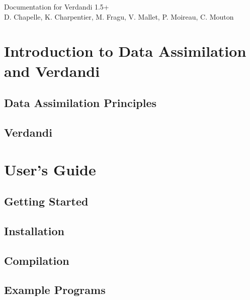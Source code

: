 \documentclass{book}
\begin{document}
\hypersetup{pageanchor=false,citecolor=blue}
\begin{titlepage}
\vspace*{7cm}
\begin{center}
{\Large Documentation for Verdandi 1.5+}\\
\vspace*{1cm}
{\large D. Chapelle, K. Charpentier, M. Fragu, V. Mallet, P. Moireau, C. Mouton}\\
\end{center}
\end{titlepage}
\clearemptydoublepage
{}
\tableofcontents
\clearemptydoublepage
{}
\hypersetup{pageanchor=true,citecolor=blue}
\part{Introduction to Data Assimilation and Verdandi}
\chapter{Data Assimilation Principles}

\chapter{Verdandi}
\label{index}\hypertarget{index}{}
\part{User's Guide}
\chapter{Getting Started}
\label{getting_started}
\hypertarget{getting_started}{}

\chapter{Installation}
\label{installation}
\hypertarget{installation}{}

\chapter{Compilation}
\label{compilation}
\hypertarget{compilation}{}

\chapter{Example Programs}
\label{example_programs}
\hypertarget{example_programs}{}

\end{document}
